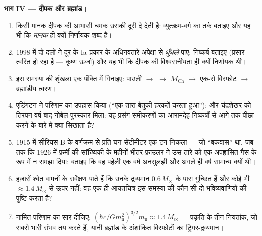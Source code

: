 \begin{problem}
\medskip\noindent\textbf{भाग IV --- दीपक और
ब्रह्मांड।}
\begin{enumerate}[resume]
  \item किसी मानक दीपक की आभासी चमक उसकी दूरी दे देती है:
        व्युत्क्रम-वर्ग का तर्क बताइए और यह भी कि \emph{मानक} ही
        क्यों निर्णायक शब्द है।
  \item 1998 में दो दलों ने दूर के Ia प्रकार के अधिनवतारे अपेक्षा
        से \emph{धुँधले} पाए: निष्कर्ष बताइए (प्रसार त्वरित हो रहा
        है --- कृष्ण ऊर्जा) और यह भी कि दीपक की विश्वसनीयता ही
        क्यों निर्णायक थी।
  \item इस समस्या की शृंखला एक पंक्ति में गिनाइए: पाउली $\to$
         $\to$ $M_{\text{Ch}}$ $\to$ एक-से
        विस्फोट $\to$ ब्रह्मांडीय त्वरण।
  \item एडिंगटन ने परिणाम का उपहास किया (``एक तारा बेतुकी हरकतें
        करता हुआ''); और चंद्रशेखर को तिरपन वर्ष बाद नोबेल पुरस्कार
        मिला: यह प्रसंग समीकरणों का आरामदेह निष्कर्षों से आगे तक
        पीछा करने के बारे में क्या सिखाता है?
  \item 1915 में सीरियस B के वर्णक्रम से प्रति घन सेंटीमीटर एक टन
        निकला --- जो ``बकवास'' था, जब तक कि 1926 में फ़र्मी की
        सांख्यिकी के महीनों भीतर फ़ाउलर ने उस तारे को एक अपह्रासित
        गैस के रूप में न समझा दिया: बताइए कि वह पहेली एक वर्ष
        अनसुलझी और अगले ही वर्ष सामान्य क्यों थी।
  \item हज़ारों श्वेत वामनों के सर्वेक्षण पाते हैं कि उनके
        द्रव्यमान $0.6\,M_\odot$ के पास गुच्छित हैं और कोई भी
        $\approx1.4\,M_\odot$ से ऊपर नहीं: वह एक ही आयतचित्र इस
        समस्या की कौन-सी दो भविष्यवाणियों की पुष्टि करता है?
  \item नामित परिणाम का सार दीजिए: $(\hbar c/Gm_{\text{n}}^2)^{
        3/2}m_{\text{n}} \approx 1.4\,M_\odot$ --- प्रकृति के तीन
        नियतांक, जो सबसे भारी संभव  तय करते हैं, यानी
        ब्रह्मांड के अंशांकित विस्फोटों का ट्रिगर-द्रव्यमान।
\end{enumerate}
\end{problem}
